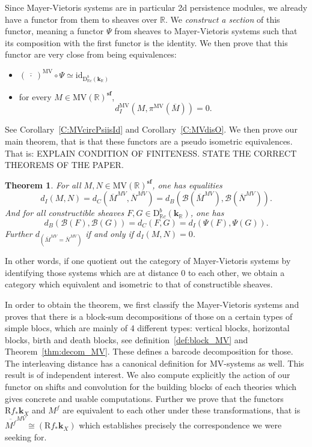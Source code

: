 \documentclass[a4paper, english, 11pt]{article}
\newcommand{\kk}[0]{\textbf{k}}
\newcommand{\0}{\vec{0}}
\newcommand{\R}[0]{\mathbb{R}}
\newcommand{\D}[0]{\text{D}}
\newcommand{\Rr}[0]{\text{R}}
\newcommand{\MV}{\text{MV}}
\newcommand{\s}{\textbf{sf}}
\newtheorem{thm}[prop]{Theorem}
\begin{document}
Since Mayer-Vietoris systems are in particular 2d persistence modules, we already have a functor from them to sheaves over $\R$. We \emph{construct a section} of this functor, meaning a functor $\Psi$ from sheaves to Mayer-Vietoris systems such that its composition with the first functor is the identity.
We then prove that this functor are very close from being equivalences:
\begin{itemize} \item $(\overline{~\cdot~ })^{\text{MV}} \circ \Psi \simeq \text{id}_{\D^b_{\R c}(\kk_\R)}$
\item  for every $M\in \text{MV}(\R)^\s$, $$d_I^{\text{MV}}(M, \pi^\MV ( \overline{M})) = 0.$$
\end{itemize}
See Corollary~\ref{C:MVcircPsiisId} and Corollary~\ref{C:MVdisO}. 
We then prove our main theorem, that is that these functors are a pseudo isometric equivalences.
That is: EXPLAIN CONDITION OF FINITENESS. STATE THE CORRECT THEOREMS OF THE PAPER.
\begin{thm}
 For all $M, N \in \mbox{MV}(\R)^\s$,  one has equalities 
$$d_I(M, N) = d_C (\overline{M}^{MV}, \overline{N}^{MV}) = d_B(\mathcal{B}(\overline{M}^{MV}), \mathcal{B}(\overline{N}^{MV})). $$ 
And for all constructible sheaves $F, G \in \D^b_{\R c}(\kk_\R)$, one has 
$$ d_B(\mathcal{B}(F), \mathcal{B}(G)) = d_C(F,G) =d_I(\Psi(F), \Psi(G)).$$
Further $d_(\overline{M}^{MV} = \overline{N}^{MV}) $ if and only if $d_I({M}, {N})=0$.
\end{thm}
In other words, if one quotient out the category of Mayer-Vietoris systems by identifying those systems which are at distance $0$ to each other, we obtain a category which equivalent and isometric to that of constructible sheaves.

\medskip 

In order to obtain the theorem, we first classify the Mayer-Vietoris systems and proves that there is a block-sum decompositions of those on a certain types of simple blocs, which are mainly of 4 different types: vertical blocks, horizontal blocks, birth and death blocks, see definition~\ref{def:block_MV} and Theorem~\ref{thm:decom_MV}. These defines a barcode decomposition for those. The interleaving distance has a canonical definition for MV-systems as well. This result is of independent interest. 
We also compute explicitly the action of our functor on shifts and convolution for the building blocks of each theories which gives concrete and usable computations. Further we prove that the functors $\Rr f_* \kk_X$ and $M^f$ are equivalent to each other under these transformations, that is $\overline{M^f}^{MV} \cong (\Rr f_* \kk_X)$ which establishes precisely the correspondence we were seeking for. 
\end{document}
